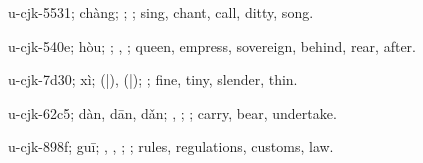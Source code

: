 \begin{multicols}{2}
{\cjkgGlue{}u-cjk-5531; chàng; \cjkgGlue{}\cjkgGlue{}\cjkgGlue{}; \cjkgGlue{}; sing, chant, call, ditty, song.

\cjkgGlue{}u-cjk-540e; hòu; \cjkgGlue{}; \cjkgGlue{}, \cjkgGlue{}; queen, empress, sovereign, behind, rear, after.

\cjkgGlue{}u-cjk-7d30; xì; \cjkgGlue{}\cjkgGlue{}(\cjkgGlue{}|\cjkgGlue{}), \cjkgGlue{}\cjkgGlue{}(\cjkgGlue{}|\cjkgGlue{}); \cjkgGlue{}; fine, tiny, slender, thin.

\cjkgGlue{}u-cjk-62c5; dàn, dān, dǎn; \cjkgGlue{}\cjkgGlue{}\cjkgGlue{}, \cjkgGlue{}\cjkgGlue{}\cjkgGlue{}; \cjkgGlue{}; carry, bear, undertake.

\cjkgGlue{}u-cjk-898f; guī; \cjkgGlue{}, \cjkgGlue{}, \cjkgGlue{}; \cjkgGlue{}; rules, regulations, customs, law.

}
\end{multicols}
